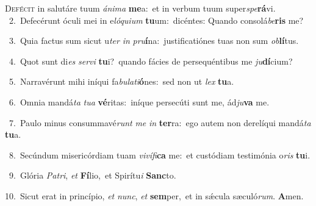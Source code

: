 \lettrine{\initial\textcolor{\initialcolor}{D}}{efécit} in salutáre tuum \textit{á}\-\textit{ni}\textit{ma} \textbf{me}\-a:~\star et in verbum tuum super\-\textit{spe}\-\textbf{rá}vi.\\
{\numbfont\textcolor{\numbcolor}{~2.}}~Defecérunt óculi mei in e\-\textit{ló}\-\textit{qui}\textit{um} \textbf{tu}\-um:~\star dicéntes: Quando consolá\-\textit{be}\-\textbf{ris} me?\par
{\numbfont\textcolor{\numbcolor}{~3.}}~Quia factus sum sicut u\textit{ter} \textit{in} \textit{pru}\-\textbf{í}na:~\star justificatiónes tuas non sum \textit{ob}\-\textbf{lí}tus.\par
{\numbfont\textcolor{\numbcolor}{~4.}}~Quot sunt di\textit{es} \textit{ser}\-\textit{vi} \textbf{tu}\-i?~\star quando fácies de persequéntibus me \textit{ju}\-\textbf{dí}cium?\par
{\numbfont\textcolor{\numbcolor}{~5.}}~Narravérunt mihi iníqui fa\-\textit{bu}\-\textit{la}\textit{ti}\textbf{ó}nes:~\star sed non ut \textit{lex} \textbf{tu}\-a.\par
{\numbfont\textcolor{\numbcolor}{~6.}}~Omnia mandá\textit{ta} \textit{tu}\-\textit{a} \textbf{vé}\-ritas:~\star iníque persecúti sunt me, ád\-\textit{ju}\-\textbf{va} me.\par
{\numbfont\textcolor{\numbcolor}{~7.}}~Paulo minus consummavé\textit{runt} \textit{me} \textit{in} \textbf{ter}\-ra:~\star ego autem non derelíqui mandá\textit{ta} \textbf{tu}\-a.\par
{\numbfont\textcolor{\numbcolor}{~8.}}~Secúndum misericórdiam tuam \textit{vi}\-\textit{ví}\textit{fi}\textbf{ca} me:~\star et custódiam testimónia o\textit{ris} \textbf{tu}\-i.\par
{\numbfont\textcolor{\numbcolor}{~9.}}~Glória \textit{Pa}\-\textit{tri}, \textit{et} \textbf{Fí}\-lio,~\star et Spirítu\textit{i} \textbf{Sanc}\-to.\par
{\numbfont\textcolor{\numbcolor}{10.}}~Sicut erat in princípio, \textit{et} \textit{nunc}\-, \textit{et} \textbf{sem}\-per,~\star et in sǽcula sæculó\-\textit{rum}\-. \textbf{A}\-men.\par
